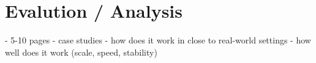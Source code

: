\chapter{Evalution / Analysis}

- 5-10 pages
- case studies - how does it work in close to real-world settings
- how well does it work (scale, speed, stability)
